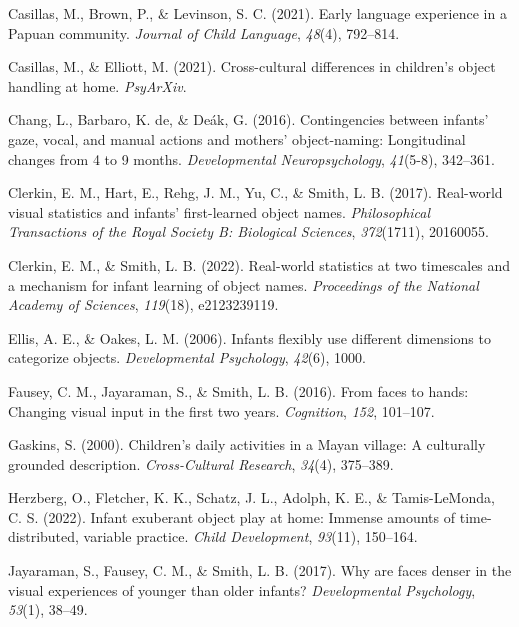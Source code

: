 \documentclass[10pt, letterpaper]{article}
\newenvironment{CSLReferences}%
  {}%
  {\par}
\begin{document}
\begin{CSLReferences}
\leavevmode\hypertarget{ref-casillas2021early}{}%
Casillas, M., Brown, P., \& Levinson, S. C. (2021). Early language
experience in a {Papuan} community. \emph{Journal of Child Language},
\emph{48}(4), 792--814.

\leavevmode\hypertarget{ref-casillasURdaylong}{}%
Casillas, M., \& Elliott, M. (2021). Cross-cultural differences in
children's object handling at home. \emph{PsyArXiv}.

\leavevmode\hypertarget{ref-chang2016contingencies}{}%
Chang, L., Barbaro, K. de, \& Deák, G. (2016). Contingencies between
infants' gaze, vocal, and manual actions and mothers' object-naming:
Longitudinal changes from 4 to 9 months. \emph{Developmental
Neuropsychology}, \emph{41}(5-8), 342--361.

\leavevmode\hypertarget{ref-clerkin2017real}{}%
Clerkin, E. M., Hart, E., Rehg, J. M., Yu, C., \& Smith, L. B. (2017).
Real-world visual statistics and infants' first-learned object names.
\emph{Philosophical Transactions of the Royal Society B: Biological
Sciences}, \emph{372}(1711), 20160055.

\leavevmode\hypertarget{ref-clerkin2022real}{}%
Clerkin, E. M., \& Smith, L. B. (2022). Real-world statistics at two
timescales and a mechanism for infant learning of object names.
\emph{Proceedings of the National Academy of Sciences}, \emph{119}(18),
e2123239119.

\leavevmode\hypertarget{ref-ellis2006infants}{}%
Ellis, A. E., \& Oakes, L. M. (2006). Infants flexibly use different
dimensions to categorize objects. \emph{Developmental Psychology},
\emph{42}(6), 1000.

\leavevmode\hypertarget{ref-fausey2016faces}{}%
Fausey, C. M., Jayaraman, S., \& Smith, L. B. (2016). From faces to
hands: Changing visual input in the first two years. \emph{Cognition},
\emph{152}, 101--107.

\leavevmode\hypertarget{ref-gaskins2000childrens}{}%
Gaskins, S. (2000). Children's daily activities in a {M}ayan village: A
culturally grounded description. \emph{Cross-Cultural Research},
\emph{34}(4), 375--389.

\leavevmode\hypertarget{ref-herzberg2022infant}{}%
Herzberg, O., Fletcher, K. K., Schatz, J. L., Adolph, K. E., \&
Tamis-LeMonda, C. S. (2022). Infant exuberant object play at home:
Immense amounts of time-distributed, variable practice. \emph{Child
Development}, \emph{93}(11), 150--164.

\leavevmode\hypertarget{ref-jayaraman2017faces}{}%
Jayaraman, S., Fausey, C. M., \& Smith, L. B. (2017). Why are faces
denser in the visual experiences of younger than older infants?
\emph{Developmental Psychology}, \emph{53}(1), 38--49.


\end{CSLReferences}
\end{document}
